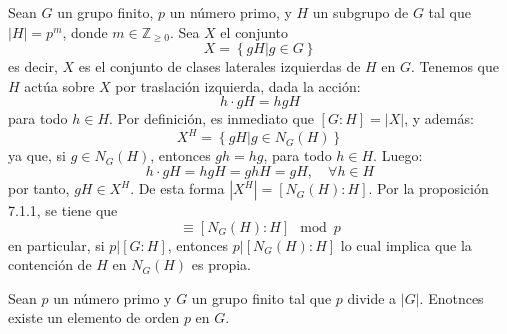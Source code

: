 \documentclass[12pt]{report}
\theoremstyle{largebreak}
\begin{document}
    \begin{exa}
        Sean $G$ un grupo finito, $p$ un número primo, y $H$ un subgrupo de $G$ tal que $|H|=p^m$, donde $m\in\mathbb{Z}_{\geq0}$. Sea $X$ el conjunto
        \begin{equation*}
            X=\left\{gH| g\in G \right\}
        \end{equation*}
        es decir, $X$ es el conjunto de clases laterales izquierdas de $H$ en $G$. Tenemos que $H$ actúa sobre $X$ por traslación izquierda, dada la acción:
        \begin{equation*}
            h\cdot gH = hgH
        \end{equation*}
        para todo $h\in H$. Por definición, es inmediato que $\left[G:H\right]=|X|$, y además:
        \begin{equation*}
            X^H=\left\{gH|g\in N_G\left(H\right) \right\}
        \end{equation*}
        ya que, si $g\in N_G\left(H\right)$, entonces $gh=hg$, para todo $h\in H$. Luego:
        \begin{equation*}
            h\cdot gH = hgH=ghH=gH,\quad\forall h\in H
        \end{equation*}
        por tanto, $gH\in X^H$. De esta forma $|X^H|=[N_G(H):H]$. Por la proposición 7.1.1, se tiene que
        \begin{equation*}
            [G:H]\equiv[N_G(H):H]\mod p
        \end{equation*}
        en particular, si $p|[G:H]$, entonces $p|[N_G(H):H]$ lo cual implica que la contención de $H$ en $N_G(H)$ es propia.
    \end{exa}

    \begin{theor}
        Sean $p$ un número primo y $G$ un grupo finito tal que $p$ divide a $|G|$. Enotnces existe un elemento de orden $p$ en $G$.
    \end{theor}
\end{document}
